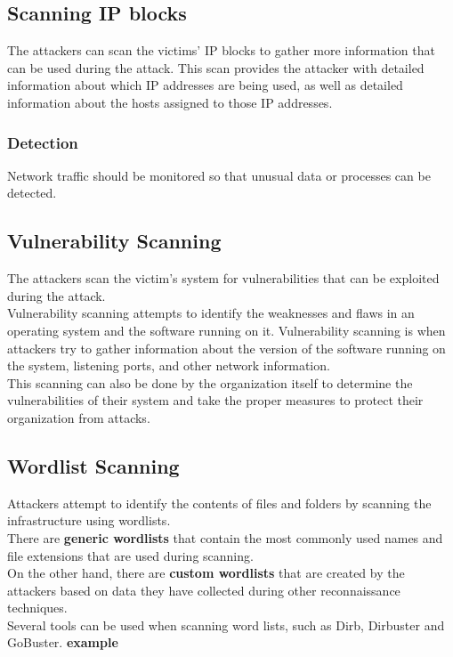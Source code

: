  \subsection{Scanning IP blocks}
 The attackers can scan the victims' IP blocks to gather more information that can be used during the attack. 
 This scan provides the attacker with detailed information about which IP addresses are being used, as well as detailed information about the hosts assigned to those IP addresses.

 \subsubsection{Detection}
 Network traffic should be monitored so that unusual data or processes can be detected.

 \subsection{Vulnerability Scanning}
 The attackers scan the victim's system for vulnerabilities that can be exploited during the attack. \\
 Vulnerability scanning attempts to identify the weaknesses and flaws in an operating system and the software running on it. Vulnerability scanning is when attackers try to gather information about the version of the software running on the system, listening ports, and other network information. \\
 This scanning can also be done by the organization itself to determine the vulnerabilities of their system and take the proper measures to protect their organization from attacks.


 \subsection{Wordlist Scanning}
 Attackers attempt to identify the contents of files and folders by scanning the infrastructure using wordlists. \\
 There are \textbf{generic wordlists} that contain the most commonly used names and file extensions that are used during scanning. \\
 On the other hand, there are \textbf{custom wordlists} that are created by the attackers based on data they have collected during other reconnaissance techniques. \\
Several tools can be used when scanning word lists, such as Dirb, Dirbuster and GoBuster.
\textbf{example}

